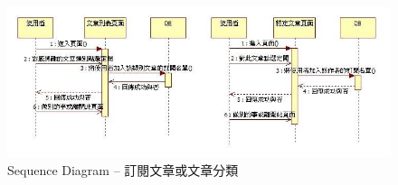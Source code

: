 \begin{figure}[H]
\centering
\includegraphics[width=\textwidth]{img/useseq/stage2/seqSearch.jpg}
\caption{Sequence Diagram -- 訂閱文章或文章分類}
\label{pic:seq:search}
\end{figure}

